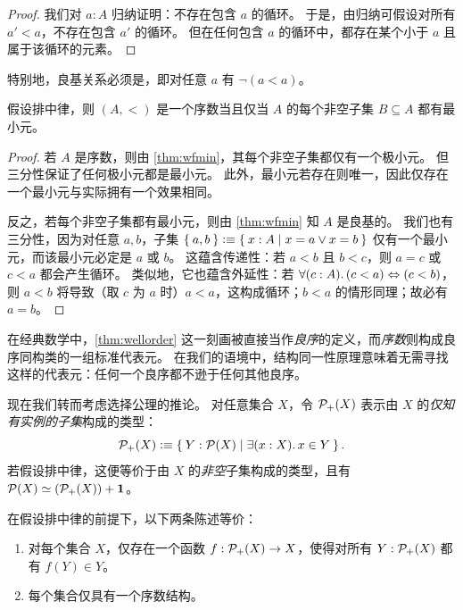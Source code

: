 \begin{proof}
  我们对 $a:A$ 归纳证明：不存在包含 $a$ 的循环。
  于是，由归纳可假设对所有 $a'<a$，不存在包含 $a'$ 的循环。
  但在任何包含 $a$ 的循环中，都存在某个小于 $a$ 且属于该循环的元素。
\end{proof}

%
%
特别地，良基关系必须是，即对任意 $a$ 有 $\neg(a<a)$。

\begin{thm}\label{thm:wellorder}
  假设排中律，则 $(A,<)$ 是一个序数当且仅当 $A$ 的每个非空子集 $B\subseteq A$ 都有最小元。
\end{thm}

\begin{proof}
  若 $A$ 是序数，则由 \cref{thm:wfmin}，其每个非空子集都仅有一个极小元。
  但三分性保证了任何极小元都是最小元。
  此外，最小元若存在则唯一，因此仅存在一个最小元与实际拥有一个效果相同。

  反之，若每个非空子集都有最小元，则由 \cref{thm:wfmin} 知 $A$ 是良基的。
  我们也有三分性，因为对任意 $a,b$，子集
  $ \Set{a,b} \vcentcolon\equiv \Set{x:A | x=a \lor x=b} $
  仅有一个最小元，而该最小元必定是 $a$ 或 $b$。
  这蕴含传递性：若 $a<b$ 且 $b<c$，则 $a=c$ 或 $c<a$ 都会产生循环。
  类似地，它也蕴含外延性：若 $\fall{c:A}(c<a)\Leftrightarrow (c<b)$，则 $a<b$ 将导致（取 $c$ 为 $a$ 时）$a<a$，这构成循环；$b<a$ 的情形同理；故必有 $a=b$。
\end{proof}

在经典数学中，\cref{thm:wellorder} 这一刻画被直接当作\emph{良序}的定义，而\emph{序数}则构成良序同构类的一组标准代表元。
在我们的语境中，结构同一性原理意味着无需寻找这样的代表元：任何一个良序都不逊于任何其他良序。

现在我们转而考虑选择公理的推论。
对任意集合 $X$，令 $\mathcal{P}_+(X)$ 表示由 $X$ 的\emph{仅知有实例的子集}构成的类型：
\[ \powerp X \defeq \setof{ Y : \power X | \exis{x:X} x\in Y}. \]
若假设排中律，这便等价于由 $X$ 的\emph{非空}子集构成的类型，且有 $\mathcal{P}(X) \simeq (\mathcal{P}_+(X)) + \mathbf{1}$。

\begin{thm}\label{thm:wop}
  在假设排中律的前提下，以下两条陈述等价：
  \begin{enumerate}
  \item 对每个集合 $X$，仅存在一个函数 $f: \mathcal{P}_+(X) \to X$，使得对所有 $Y:\mathcal{P}_+(X)$ 都有 $f(Y)\in Y$。\label{item:wop1}
  \item 每个集合仅具有一个序数结构。\label{item:wop2}
  \end{enumerate}
\end{thm}


